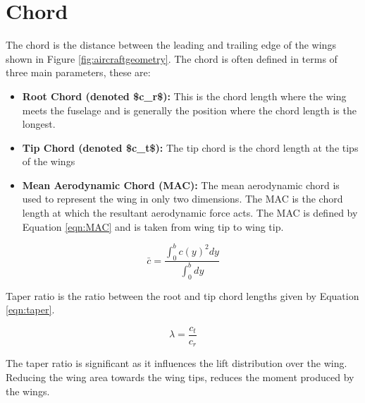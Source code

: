 \section{Chord}
The chord is the distance between the leading and trailing edge of the wings shown in Figure \ref{fig:aircraftgeometry}. The chord is often defined in terms of three main parameters, these are:

\begin{itemize}
    \item \textbf{Root Chord (denoted \acrshort{$c_r$}):} This is the chord length where the wing meets the fuselage and is generally the position where the chord length is the longest. 
    \item \textbf{Tip Chord (denoted \acrshort{$c_t$}):} The tip chord is the chord length at the tips of the wings 
    \item \textbf{Mean Aerodynamic Chord (\acrshort{MAC}):} The mean aerodynamic chord is used to represent the wing in only two dimensions. The \acrshort{MAC} is the chord length at which the resultant aerodynamic force acts. The \acrshort{MAC} is defined by Equation \ref{eqn:MAC} and is taken from wing tip to wing tip. 
    
    
\end{itemize} 

\begin{equation}
    \bar{c} =  \frac{ \int_{0}^{b} c(y)^2 dy}{\int_{0}^{b} dy}
    \label{eqn:MAC}
\end{equation}


 Taper ratio is the ratio between the root and tip chord lengths given by Equation \ref{eqn:taper}.
 
 \begin{equation}
     \lambda = \frac{c_t}{c_r}
     \label{eqn:taper}
 \end{equation}
 
 The taper ratio is significant as it influences the lift distribution over the wing. Reducing the wing area towards the wing tips, reduces the moment produced by the wings.
 
